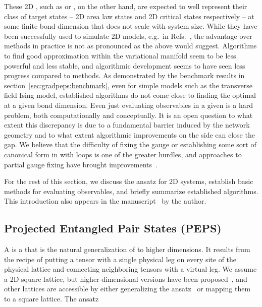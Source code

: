 These 2D , such as  \cite{nishio2004, verstraete2004} or  \cite{vidal2007a, vidal2008, evenbly2009}, on the other hand, are expected to well represent their class of target states -- 2D area law states and 2D critical states respectively -- at some finite bond dimension that does not scale with system size.
%
While they have been successfully used to simulate 2D models, e.g.~in Refs.~\cite{corboz2011, corboz2016, zheng2017}, the advantage over  methods in practice is not as pronounced as the above would suggest.
%
Algorithms to find good approximation within the variational manifold seem to be less powerful and less stable, and algorithmic development seems to have seen less progress compared to  methods.
%
As demonstrated by the benchmark results in section~\ref{sec:gradpeps:benchmark}, even for simple models such as the transverse field Ising model, established  algorithms do not come close to finding the optimal  at a given bond dimension.
%
Even just evaluating observables in a given  is a hard problem, both computationally and conceptually.
%
It is an open question to what extent this discrepancy is due to a fundamental barrier induced by the network geometry and to what extent algorithmic improvements on the  side can close the gap.
%
We believe that the difficulty of fixing the gauge or establishing some sort of canonical form in  with loops is one of the greater hurdles, and approaches to partial gauge fixing have brought improvements~\cite{lubasch2014a, phien2015}.





For the rest of this section, we discuss the  ansatz for 2D systems, establish basic methods for evaluating observables, and briefly summarize established algorithms.
%
This introduction also appears in the manuscript~\cite{unfried2024} by the author.

\subsection{Projected Entangled Pair States (PEPS)}
\label{subsec:tensornets:peps:ansatz}

A  is a  that is the natural generalization of  to higher dimensions.
%
It results from the recipe of putting a tensor with a single physical leg on every site of the physical lattice and connecting neighboring tensors with a virtual leg.
%
We assume a 2D square lattice, but higher-dimensional versions have been proposed~\cite{vlaar2021, vlaar2023}, and other lattices are accessible by either generalizing the ansatz~\cite{jahromi2019} or mapping them to a square lattice.
%
The ansatz

